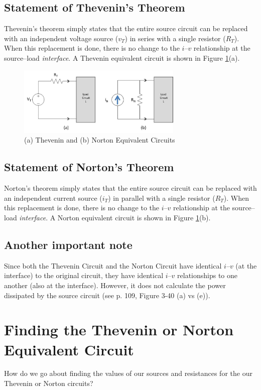 \documentclass{handout}
\begin{document}
\subsection{Statement of Thevenin's Theorem}
Thevenin's theorem simply states that the entire source circuit can be replaced with an independent voltage source ($v_T$) in series with a single resistor ($R_T$).  When this replacement is done, there is no change to the $i$--$v$ relationship at the source--load {\em interface}. A  Thevenin equivalent circuit is shown in Figure \ref{fig: Thevenin_Norton}(a).

\begin{figure} [h t b]
\centering
\includegraphics[width=0.7\textwidth]{Thevenin_Norton.jpg}
\caption{(a) Thevenin and (b) Norton Equivalent Circuits}
\label{fig: Thevenin_Norton}
\end{figure}

\subsection{Statement of Norton's Theorem}
Norton's theorem simply states that the entire source circuit can be replaced with an independent current source ($i_T$) in parallel with a single resistor ($R_T$).  When this replacement is done, there is no change to the $i$--$v$ relationship at the source--load {\em interface}.  A  Norton equivalent circuit is shown in Figure \ref{fig: Thevenin_Norton}(b).



\subsection{Another important note}
Since both the Thevenin Circuit and the Norton Circuit have identical $i$--$v$ (at the interface) to the original circuit, they have identical $i$--$v$ relationships to one another (also at the interface). However, it does not calculate the power dissipated by the source circuit (see p. 109, Figure 3-40 (a) vs (e)).

\section{Finding the Thevenin or Norton Equivalent Circuit}
How do we go about finding the values of our sources and resistances for the our Thevenin or Norton circuits?
\end{document}
